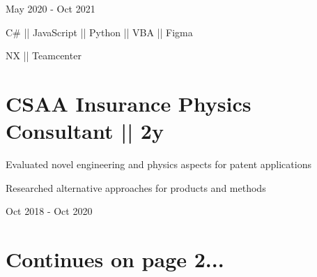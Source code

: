 \begin{subtitle}
    \vspace{-34.8ex}
    {{May 2020 - Oct 2021}} 
\end{subtitle}

{ \vspace{24ex} \color{cyan}\small
{C\# || JavaScript || Python || VBA || Figma} }

{
\vspace{-2.5ex}\hspace{3.17in} \color{cyan} \small
{NX || Teamcenter} }
\vspace{1ex}


\section
{\textbf{CSAA Insurance} \newline
Physics Consultant || 2y}{}


\begin{detail}
\vspace{-2.5ex}
\BulletItem
Evaluated novel engineering and physics aspects for patent applications

\BulletItem
Researched alternative approaches for products and methods
\end{detail}

\begin{subtitle}
\vspace{-7.8ex}
{{Oct 2018 - Oct 2020}} 
\end{subtitle}

\begin{subtitle}
\vspace{-2.0ex}
\end{subtitle}
\vspace{-1ex}


\vspace{3ex}
\section{Continues on page 2...}{}


